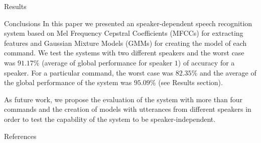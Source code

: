\documentclass[final]{beamer}
\begin{document}
\begin{frame}{}
\begin{textblock}{39.5}
\begin{block}{Results}
\end{block}

\begin{block}{Conclusions}
In this paper we presented an speaker-dependent speech recognition system based on Mel Frequency Cepstral Coefficients (MFCCs) for extracting features and Gaussian Mixture Models (GMMs) for creating the model of each command. We test the systems with two different speakers and the worst case was $91.17\%$ (average of global performance for speaker $1$) of accuracy for a speaker. For a particular command, the worst case was $82.35\%$ and the average of the global performance of the system was $95.09\%$ (see Results section).

As future work, we propose the evaluation of the system with more than four commands and the creation of models with utterances from different speakers in order to test the capability of the system to be speaker-independent.
\end{block}

\begin{block}{References}
\small

\end{block}

\end{textblock}

\end{frame}
\end{document}
